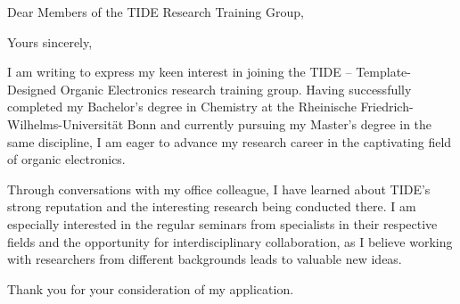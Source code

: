 \documentclass[11pt,a4paper,sans]{moderncv}
\begin{document}
\makecvtitle

\vspace{-1cm}


\date{\today}

\opening{Dear Members of the TIDE Research Training Group,}

\closing{Yours sincerely,}

\makelettertitle

I am writing to express my keen interest in joining the TIDE – Template-Designed Organic Electronics research training group. Having successfully completed my Bachelor's degree in Chemistry at the Rheinische Friedrich-Wilhelms-Universität Bonn and currently pursuing my Master's degree in the same discipline, I am eager to advance my research career in the captivating field of organic electronics.

Through conversations with my office colleague, I have learned about TIDE's strong reputation and the interesting research being conducted there. I am especially interested in the regular seminars from specialists in their respective fields and the opportunity for interdisciplinary collaboration, as I believe working with researchers from different backgrounds leads to valuable new ideas.

Thank you for your consideration of my application.

\vspace{1cm}
\makeletterclosing
\end{document}
